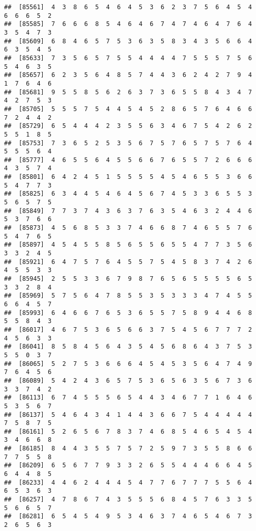 \documentclass[
]{book}
\begin{document}
\begin{verbatim}
##  [85561]  4  3  8  6  5  4  6  4  5  3  6  2  3  7  5  6  4  5  4  6  6  6  5  2
##  [85585]  7  6  6  6  8  5  4  6  4  6  7  4  7  4  6  4  7  6  4  3  5  4  7  3
##  [85609]  6  8  4  6  5  7  5  3  6  3  5  8  3  4  3  5  6  6  4  6  3  5  4  5
##  [85633]  7  3  5  6  5  7  5  5  4  4  4  4  7  5  5  5  7  5  6  5  4  6  3  5
##  [85657]  6  2  3  5  6  4  8  5  7  4  4  3  6  2  4  2  7  9  4  1  7  6  4  6
##  [85681]  9  5  5  8  5  6  2  6  3  7  3  6  5  5  8  4  3  4  7  4  2  7  5  3
##  [85705]  5  5  5  7  5  4  4  5  4  5  2  8  6  5  7  6  4  6  6  7  2  4  4  2
##  [85729]  6  5  4  4  4  2  3  5  5  6  3  4  6  7  5  4  2  6  2  5  5  1  8  5
##  [85753]  7  3  6  5  2  5  3  5  6  7  5  7  6  5  7  5  7  6  4  5  5  5  6  4
##  [85777]  4  6  5  5  6  4  5  5  6  6  7  6  5  5  7  2  6  6  6  4  3  5  7  4
##  [85801]  6  4  2  4  5  1  5  5  5  5  4  5  4  6  5  5  3  6  6  5  4  7  7  3
##  [85825]  6  3  4  4  5  4  6  4  5  6  7  4  5  3  3  6  5  5  3  5  6  5  7  5
##  [85849]  7  7  3  7  4  3  6  3  7  6  3  5  4  6  3  2  4  4  6  5  3  7  6  6
##  [85873]  4  5  6  8  5  3  3  7  4  6  6  8  7  4  6  5  5  7  6  5  4  7  6  5
##  [85897]  4  5  4  5  5  8  5  6  5  5  6  5  5  4  7  7  3  5  6  3  3  2  4  5
##  [85921]  6  4  7  5  7  6  4  5  5  7  5  4  5  8  3  7  4  2  6  4  5  5  3  3
##  [85945]  2  5  5  3  3  6  7  9  8  7  6  5  6  5  5  5  5  6  5  3  3  2  8  4
##  [85969]  5  7  5  6  4  7  8  5  5  3  5  3  3  3  4  7  4  5  5  6  6  4  5  7
##  [85993]  6  4  6  6  7  6  5  3  6  5  5  7  5  8  9  4  4  6  8  5  5  8  4  3
##  [86017]  4  6  7  5  3  6  5  6  6  3  7  5  4  5  6  7  7  7  2  4  5  6  3  3
##  [86041]  8  5  8  4  5  6  4  3  5  4  5  6  8  6  4  3  7  5  3  5  5  0  3  7
##  [86065]  5  2  7  5  3  6  6  6  4  5  4  5  3  5  6  4  7  4  9  7  6  4  5  6
##  [86089]  5  4  2  4  3  6  5  7  5  3  6  5  6  3  5  6  7  3  6  3  3  7  4  2
##  [86113]  6  7  4  5  5  5  6  5  4  4  3  4  6  7  7  1  6  4  6  5  3  5  6  7
##  [86137]  5  4  6  4  3  4  1  4  4  3  6  6  7  5  4  4  4  4  4  7  5  8  7  5
##  [86161]  5  2  6  5  6  7  8  3  7  4  6  8  5  4  6  5  4  5  4  3  4  6  6  8
##  [86185]  8  4  4  3  5  5  7  5  7  2  5  9  7  3  5  5  8  6  6  7  7  5  5  8
##  [86209]  6  5  6  7  7  9  3  3  2  6  5  5  4  4  4  6  6  4  5  6  4  4  8  5
##  [86233]  4  4  6  2  4  4  4  5  4  7  7  6  7  7  7  5  5  6  4  6  5  3  6  3
##  [86257]  4  7  8  6  7  4  3  5  5  5  6  8  4  5  7  6  3  3  5  5  6  6  5  7
##  [86281]  6  5  4  5  4  9  5  3  4  6  3  7  4  6  5  4  6  7  3  2  6  5  6  3

\end{verbatim}
\end{document}
